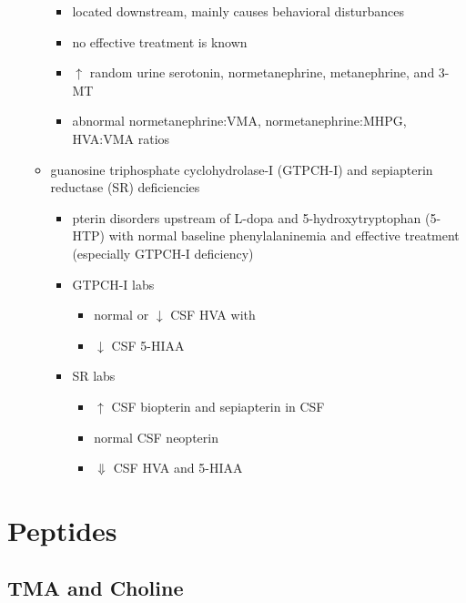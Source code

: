 \documentclass{scrartcl}
\begin{document}
\begin{itemize}
\begin{itemize}
\begin{itemize}
\item located downstream, mainly causes behavioral disturbances
\item no effective treatment is known
\item \(\uparrow\) random urine serotonin, normetanephrine, metanephrine, and 3-MT
\item abnormal normetanephrine:VMA, normetanephrine:MHPG, HVA:VMA ratios
\end{itemize}
\item guanosine triphosphate cyclohydrolase-I (GTPCH-I) and
sepiapterin reductase (SR) deficiencies
\begin{itemize}
\item pterin disorders upstream of L-dopa and 5-hydroxytryptophan
(5-HTP) with normal baseline phenylalaninemia and effective
treatment (especially GTPCH-I deficiency)
\item GTPCH-I labs
\begin{itemize}
\item normal or \(\downarrow\) CSF HVA with
\item \(\downarrow\) CSF 5-HIAA
\end{itemize}
\item SR labs
\begin{itemize}
\item \(\uparrow\) CSF biopterin and sepiapterin in CSF
\item normal CSF neopterin
\item \(\Downarrow\) CSF HVA and 5-HIAA
\end{itemize}
\end{itemize}
\end{itemize}
\end{itemize}
\section{Peptides}
\label{sec:orgae8c70c}
\subsection{TMA and Choline}
\label{sec:org8e3527c}
\end{document}

